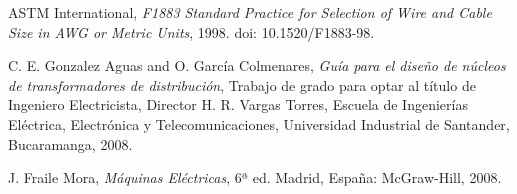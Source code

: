 \documentclass[conference]{IEEEtran}
\theoremstyle{mytheoremstyle}
\theoremstyle{mytheoremstyle}
\theoremstyle{myproblemstyle}
\begin{document}


        \begin{thebibliography}{1}
            
            ASTM International, \emph{F1883 Standard Practice for Selection of Wire and Cable Size in AWG or Metric Units}, 1998. doi: 10.1520/F1883-98.
            \label{F1883}

            C. E. Gonzalez Aguas and O. García Colmenares, \emph{Guía para el diseño de núcleos de transformadores de distribución}, Trabajo de grado para optar al título de Ingeniero Electricista, Director H. R. Vargas Torres, Escuela de Ingenierías Eléctrica, Electrónica y Telecomunicaciones, Universidad Industrial de Santander, Bucaramanga, 2008.
            \label{GonzalezGarcía2008}

            J. Fraile Mora, \emph{Máquinas Eléctricas}, 6ª ed. Madrid, España: McGraw-Hill, 2008.
            \label{Fraile2008}

        \end{thebibliography}

        
\end{document}
